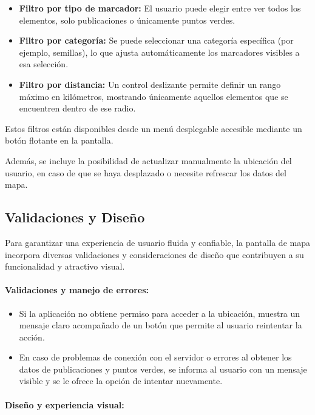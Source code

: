 \documentclass[11pt, a4paper, oneside]{book}
\begin{document}
\begin{itemize}
    \item \textbf{Filtro por tipo de marcador:} El usuario puede elegir entre ver todos los elementos, solo publicaciones o únicamente puntos verdes.

    \item \textbf{Filtro por categoría:} Se puede seleccionar una categoría específica (por ejemplo, semillas), lo que ajusta automáticamente los marcadores visibles a esa selección.

    \item \textbf{Filtro por distancia:} Un control deslizante permite definir un rango máximo en kilómetros, mostrando únicamente aquellos elementos que se encuentren dentro de ese radio.
\end{itemize}

Estos filtros están disponibles desde un menú desplegable accesible mediante un botón flotante en la pantalla.

Además, se incluye la posibilidad de actualizar manualmente la ubicación del usuario, en caso de que se haya desplazado o necesite refrescar los datos del mapa.

\subsection{Validaciones y Diseño}

Para garantizar una experiencia de usuario fluida y confiable, la pantalla de mapa incorpora diversas validaciones y consideraciones de diseño que contribuyen a su funcionalidad y atractivo visual.

\paragraph{Validaciones y manejo de errores:}
\begin{itemize}
    \item Si la aplicación no obtiene permiso para acceder a la ubicación, muestra un mensaje claro acompañado de un botón que permite al usuario reintentar la acción.

    \item En caso de problemas de conexión con el servidor o errores al obtener los datos de publicaciones y puntos verdes, se informa al usuario con un mensaje visible y se le ofrece la opción de intentar nuevamente.
\end{itemize}

\paragraph{Diseño y experiencia visual:}
\end{document}
